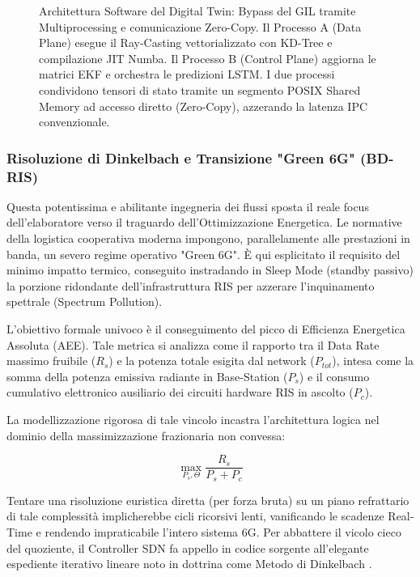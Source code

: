 \documentclass[twoside]{article}
\begin{document}
\begin{figure}[H]
    \caption{Architettura Software del Digital Twin: Bypass del GIL tramite Multiprocessing e comunicazione Zero-Copy. Il Processo A (Data Plane) esegue il Ray-Casting vettorializzato con KD-Tree e compilazione JIT Numba. Il Processo B (Control Plane) aggiorna le matrici EKF e orchestra le predizioni LSTM. I due processi condividono tensori di stato tramite un segmento POSIX Shared Memory ad accesso diretto (Zero-Copy), azzerando la latenza IPC convenzionale.}
    \label{fig:software_arch_zero_copy}
\end{figure}

\subsubsection{Risoluzione di Dinkelbach e Transizione "Green 6G" (BD-RIS)}

Questa potentissima e abilitante ingegneria dei flussi sposta il reale focus dell'elaboratore verso il traguardo dell'Ottimizzazione Energetica. Le normative della logistica cooperativa moderna impongono, parallelamente alle prestazioni in banda, un severo regime operativo "Green 6G". È qui esplicitato il requisito del minimo impatto termico, conseguito instradando in Sleep Mode (standby passivo) la porzione ridondante dell'infrastruttura RIS per azzerare l'inquinamento spettrale (Spectrum Pollution).

L'obiettivo formale univoco è il conseguimento del picco di Efficienza Energetica Assoluta (AEE). Tale metrica si analizza come il rapporto tra il Data Rate massimo fruibile ($R_s$) e la potenza totale esigita dal network ($P_{tot}$), intesa come la somma della potenza emissiva radiante in Base-Station ($P_s$) e il consumo cumulativo elettronico ausiliario dei circuiti hardware RIS in ascolto ($P_c$).

La modellizzazione rigorosa di tale vincolo incastra l'architettura logica nel dominio della massimizzazione frazionaria non convessa:

\begin{equation}
\max_{P_s, \Theta} \frac{R_s}{P_s + P_c}
\label{eq:aee_maximization}
\end{equation}

Tentare una risoluzione euristica diretta (per forza bruta) su un piano refrattario di tale complessità implicherebbe cicli ricorsivi lenti, vanificando le scadenze Real-Time e rendendo impraticabile l'intero sistema 6G. Per abbattere il vicolo cieco del quoziente, il Controller SDN fa appello in codice sorgente all'elegante espediente iterativo lineare noto in dottrina come Metodo di Dinkelbach \cite{Khan2024}.
\end{document}
